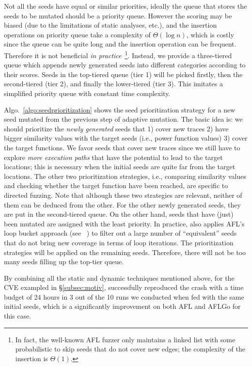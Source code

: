  Not all the seeds have equal or similar priorities, ideally the queue that stores the seeds to be mutated should be a priority queue. However the scoring may be biased (due to the limitations of static analyses, etc.), and the insertion operations on priority queue take a complexity of $\Theta(\log n)$, which is costly since the queue can be quite long and the insertion operation can be frequent. Therefore it is not beneficial \emph{in practice}~\footnote{In fact, the well-known AFL fuzzer only maintains a linked list with some probabilistic to skip seeds that do not cover new edges; the complexity of the  insertion  is $\Theta(1)$.}. Instead, we provide a three-tiered queue which appends newly generated seeds into different categories according to their scores. Seeds in the top-tiered queue (tier 1) will be picked firstly, then the second-tiered (tier 2), and finally the lower-tiered (tier 3). This imitates a simplified priority queue with constant time complexity.
 
 
 Algo.~\ref{algo:seedprioritization} shows the seed prioritization strategy for a new seed mutated from the previous step of adaptive mutation. The basic idea is: we should prioritize the \emph{newly generated} seeds that 1) cover new traces 2) have bigger similarity values with the target seeds (i.e., power function values) 3) cover the target functions. We favor seeds that cover new traces since we still have to explore \emph{more execution paths} that have the potential to lead to the target locations; this is necessary when the initial seeds are quite far from the target locations. The other two prioritization strategies, i.e., comparing similarity values and checking whether the target function have been reached, are specific to directed fuzzing. Note that although these two strategies are relevant, neither of them can be deduced from the other. For the other newly generated seeds, they are put in the second-tiered queue. On the other hand, seeds that have (just) been mutated are assigned with the least priority.
In practice, \dFOT also applies AFL's loop bucket approach (see ~\cite{afl_detail}) to filter out a large number of ``equivalent'' seeds that do not bring new coverage in terms of loop iterations. The prioritization strategies will be applied on the remaining seeds. Therefore, there will not be too many seeds filling up the top-tier queue.

By combining all the static and dynamic techniques mentioned above, for the CVE exampled in \S\ref{subsec:motiv}, \dFOT successfully reproduced the crash with a time budget of 24 hours in 3 out of the 10 runs we conducted when fed with the same initial seeds, which is a significantly improvement on both AFL and AFLGo for this case.
 



